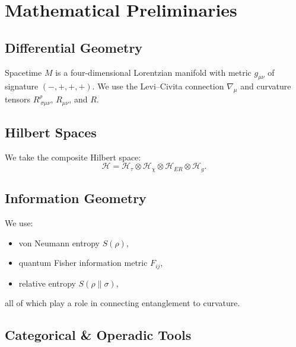 


\chapter{Mathematical Preliminaries}

\section{Differential Geometry}

Spacetime $M$ is a four-dimensional Lorentzian manifold with metric $g_{\mu\nu}$ of signature $(-,+,+,+)$. 
We use the Levi--Civita connection $\nabla_\mu$ and curvature tensors $R^\rho_{~\sigma\mu\nu}$, $R_{\mu\nu}$, and $R$.

\section{Hilbert Spaces}

We take the composite Hilbert space:
\[
\mathcal{H} = \mathcal{H}_\tau \otimes \mathcal{H}_\chi \otimes \mathcal{H}_{ER} \otimes \mathcal{H}_g.
\]

\section{Information Geometry}

We use:

\begin{itemize}
  \item von Neumann entropy $S(\rho)$,
  \item quantum Fisher information metric $F_{ij}$,
  \item relative entropy $S(\rho\|\sigma)$,
\end{itemize}

all of which play a role in connecting entanglement to curvature.

\section{Categorical \& Operadic Tools}

